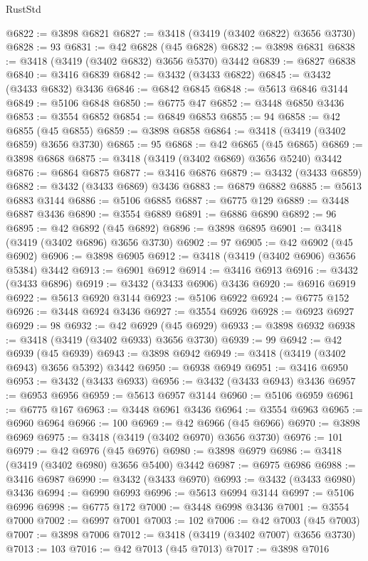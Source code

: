\begin{lexlean}{RustStd}
\begin{coremodule}
@6822 := @3898 @6821
@6827 := @3418 (@3419 (@3402 @6822) @3656 @3730)
@6828 := 93
@6831 := @42 @6828 (@45 @6828)
@6832 := @3898 @6831
@6838 := @3418 (@3419 (@3402 @6832) @3656 @5370) @3442
@6839 := @6827 @6838
@6840 := @3416 @6839
@6842 := @3432 (@3433 @6822)
@6845 := @3432 (@3433 @6832) @3436
@6846 := @6842 @6845
@6848 := @5613 @6846 @3144
@6849 := @5106 @6848
@6850 := @6775 @47
@6852 := @3448 @6850 @3436
@6853 := @3554 @6852
@6854 := @6849 @6853
@6855 := 94
@6858 := @42 @6855 (@45 @6855)
@6859 := @3898 @6858
@6864 := @3418 (@3419 (@3402 @6859) @3656 @3730)
@6865 := 95
@6868 := @42 @6865 (@45 @6865)
@6869 := @3898 @6868
@6875 := @3418 (@3419 (@3402 @6869) @3656 @5240) @3442
@6876 := @6864 @6875
@6877 := @3416 @6876
@6879 := @3432 (@3433 @6859)
@6882 := @3432 (@3433 @6869) @3436
@6883 := @6879 @6882
@6885 := @5613 @6883 @3144
@6886 := @5106 @6885
@6887 := @6775 @129
@6889 := @3448 @6887 @3436
@6890 := @3554 @6889
@6891 := @6886 @6890
@6892 := 96
@6895 := @42 @6892 (@45 @6892)
@6896 := @3898 @6895
@6901 := @3418 (@3419 (@3402 @6896) @3656 @3730)
@6902 := 97
@6905 := @42 @6902 (@45 @6902)
@6906 := @3898 @6905
@6912 := @3418 (@3419 (@3402 @6906) @3656 @5384) @3442
@6913 := @6901 @6912
@6914 := @3416 @6913
@6916 := @3432 (@3433 @6896)
@6919 := @3432 (@3433 @6906) @3436
@6920 := @6916 @6919
@6922 := @5613 @6920 @3144
@6923 := @5106 @6922
@6924 := @6775 @152
@6926 := @3448 @6924 @3436
@6927 := @3554 @6926
@6928 := @6923 @6927
@6929 := 98
@6932 := @42 @6929 (@45 @6929)
@6933 := @3898 @6932
@6938 := @3418 (@3419 (@3402 @6933) @3656 @3730)
@6939 := 99
@6942 := @42 @6939 (@45 @6939)
@6943 := @3898 @6942
@6949 := @3418 (@3419 (@3402 @6943) @3656 @5392) @3442
@6950 := @6938 @6949
@6951 := @3416 @6950
@6953 := @3432 (@3433 @6933)
@6956 := @3432 (@3433 @6943) @3436
@6957 := @6953 @6956
@6959 := @5613 @6957 @3144
@6960 := @5106 @6959
@6961 := @6775 @167
@6963 := @3448 @6961 @3436
@6964 := @3554 @6963
@6965 := @6960 @6964
@6966 := 100
@6969 := @42 @6966 (@45 @6966)
@6970 := @3898 @6969
@6975 := @3418 (@3419 (@3402 @6970) @3656 @3730)
@6976 := 101
@6979 := @42 @6976 (@45 @6976)
@6980 := @3898 @6979
@6986 := @3418 (@3419 (@3402 @6980) @3656 @5400) @3442
@6987 := @6975 @6986
@6988 := @3416 @6987
@6990 := @3432 (@3433 @6970)
@6993 := @3432 (@3433 @6980) @3436
@6994 := @6990 @6993
@6996 := @5613 @6994 @3144
@6997 := @5106 @6996
@6998 := @6775 @172
@7000 := @3448 @6998 @3436
@7001 := @3554 @7000
@7002 := @6997 @7001
@7003 := 102
@7006 := @42 @7003 (@45 @7003)
@7007 := @3898 @7006
@7012 := @3418 (@3419 (@3402 @7007) @3656 @3730)
@7013 := 103
@7016 := @42 @7013 (@45 @7013)
@7017 := @3898 @7016

\end{coremodule}
\end{lexlean}
